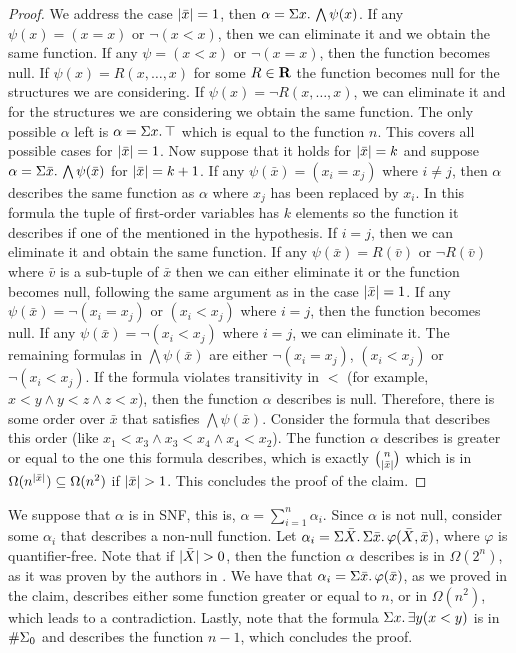 \begin{proof}
We address the case $\vert \bar{x} \vert= 1$, then $\alpha = \Sigma{x}.\,\bigwedge\psi(x)$. If any $\psi(x) = (x = x)$ or $\neg(x < x)$, then we can eliminate it and we obtain the same function. If any $\psi = (x < x)$ or $\neg(x=x)$, then the function becomes null. If $\psi(x) = R(x,\ldots,x)$ for some $R\in\mathbf{R}$ the function becomes null for the structures we are considering. If $\psi(x) = \neg R(x,\ldots,x)$, we can eliminate it and for the structures we are considering we obtain the same function. The only possible $\alpha$ left is $\alpha = \Sigma{x}.\,\top$ which is equal to the function $n$. This covers all possible cases for $\vert \bar{x} \vert = 1$. Now suppose that it holds for $\vert \bar{x} \vert = k$ and suppose $\alpha = \Sigma{\bar{x}}.\,\bigwedge\psi(\bar{x})$ for $\vert \bar{x} \vert = k+1$. If any $\psi(\bar{x}) = (x_i = x_j)$ where $i \neq j$, then $\alpha$ describes the same function as $\alpha$ where $x_j$ has been replaced by $x_i$. In this formula the tuple of first-order variables has $k$ elements so the function it describes if one of the mentioned in the hypothesis. If $i = j$, then we can eliminate it and obtain the same function. If any $\psi(\bar{x}) = R(\bar{v})$ or $\neg R(\bar{v})$ where $\bar{v}$ is a sub-tuple of $\bar{x}$ then we can either eliminate it or the function becomes null, following the same argument as in the case $\vert \bar{x} \vert = 1$. If any $\psi(\bar{x}) = \neg(x_i = x_j)$ or $(x_i < x_j)$ where $i = j$, then the function becomes null. If any $\psi(\bar{x}) = \neg(x_i < x_j)$ where $i = j$, we can eliminate it. The remaining formulas in $\bigwedge\psi(\bar{x})$ are either $\neg(x_i = x_j)$, $(x_i<x_j)$ or $\neg(x_i<x_j)$. If the formula violates transitivity in $<$ (for example, $x < y \wedge y < z \wedge z < x$), then the function $\alpha$ describes is null. Therefore, there is some order over $\bar{x}$ that satisfies $\bigwedge\psi(\bar{x})$. Consider the formula that describes this order (like $x_1 < x_3 \wedge x_3 < x_4 \wedge x_4 < x_2$). The function $\alpha$ describes is greater or equal to the one this formula describes, which is exactly $\binom{n}{\vert \bar{x} \vert}$ which is in $\Omega(n^{\vert \bar{x} \vert}) \subseteq \Omega(n^2)$ if $\vert \bar{x} \vert > 1$. This concludes the proof of the claim.
\end{proof}
We suppose that $\alpha$ is in SNF, this is, $\alpha = \sum_{i = 1}^n\alpha_i$. Since $\alpha$ is not null, consider some $\alpha_i$ that describes a non-null function. Let $\alpha_i = \Sigma{\bar{X}}.\,\Sigma{\bar{x}}.\,\varphi(\bar{X},\bar{x})$, where $\varphi$ is quantifier-free. Note that if $\vert \bar{X} \vert > 0$, then the function $\alpha$ describes is in $\Omega(2^n)$, as it was proven by the authors in \cite{SalujaST95}. We have that $\alpha_i = \Sigma{\bar{x}}.\,\varphi(\bar{x})$, as we proved in the claim, describes either some function greater or equal to $n$, or in $\Omega(n^2)$, which leads to a contradiction. Lastly, note that the formula $\Sigma{x}.\,\exists y(x < y)$ is in $\#\Sigma_{0}$ and describes the function $n-1$, which concludes the proof.


